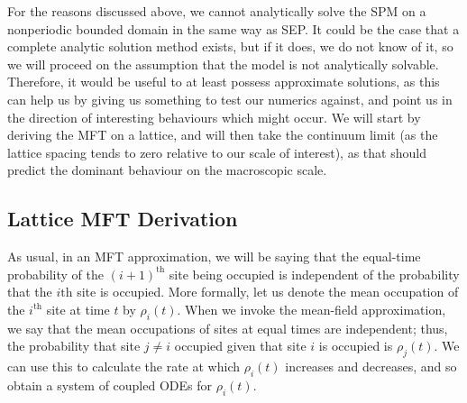 For the reasons discussed above, we cannot analytically solve the SPM on a nonperiodic bounded domain in the same way as SEP. It could be the case that a complete analytic solution method exists, but if it does, we do not know of it, so
we will proceed on the assumption that the model is not analytically solvable. Therefore, it would be useful to at least possess approximate solutions, as this can help us by giving us something to test
our numerics against, and point us in the direction of interesting behaviours which might occur. We will start by deriving the MFT on a lattice, and will then take the continuum limit (as the lattice spacing tends to zero
relative to our scale of interest), as that should predict the dominant behaviour on the macroscopic scale.


\subsection{Lattice MFT Derivation}

As usual, in an MFT approximation, we will be saying that the equal-time probability of the $(i+1)^\mathrm{th}$ site being occupied is independent of the probability that the $i\mathrm{th}$ site is occupied.
More formally, let us denote the mean occupation of the $i^\mathrm{th}$ site at time $t$ by $\rho_i (t)$. When we invoke the mean-field approximation, we say that the mean occupations of sites at equal times are independent; thus,
the probability that site $j \ne i$ occupied given that site $i$ is occupied is $\rho_j (t)$. We can use this to calculate the rate at which $\rho_i (t)$ increases and decreases, and so obtain a system of coupled ODEs for $\rho_i (t)$.

